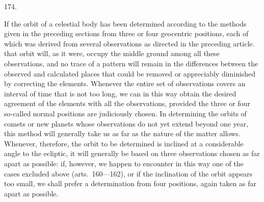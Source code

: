 \par{}\medskip
\begin{center}\hypertarget{native-245-article174}{}174.\end{center}
If the orbit of a celestial body has been determined according to the methods given in the preceding sections from three or four geocentric positions, each of which was derived from several observations as directed in the preceding article. that orbit will, as it were, occupy the middle ground among all these observations, and no trace of a pattern will remain in the differences between the observed and calculated places that could be removed or appreciably diminished by correcting the elements. Whenever the entire set of observations covers an interval of time that is not too long, we can in this way obtain the desired agreement of the elements with all the observations, provided the three or four so-called normal positions are judiciously chosen. In determining the orbits of comets or new planets whose observations do not yet extend beyond one year, this method will generally take us as far as the nature of the matter allows. Whenever, therefore, the orbit to be determined is inclined at a considerable angle to the ecliptic, it will generally be based on three observations chosen as far apart as possible: if, however, we happen to encounter in this way one of the cases excluded above (arts.\ 160---162), or if the inclination of the orbit appears too small, we shall prefer a determination from four positions, again taken as far apart as possible.

